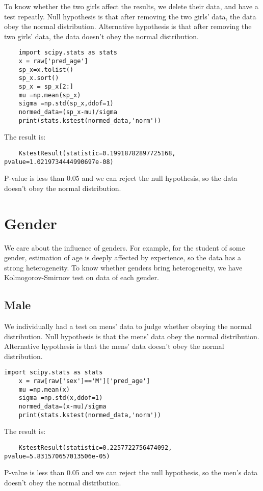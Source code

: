 \documentclass[fancy,11pt,twocol]{elegantbook}
\begin{document}
To know whether the two girls affect the results, we delete their data, and have a test repeatly.
Null hypothesis is that after removing the two girls' data, the data obey the normal distribution.
Alternative hypothesis is that after removing the two girls' data, the data doesn't obey the normal distribution.
\begin{lstlisting}
	import scipy.stats as stats
	x = raw['pred_age']
	sp_x=x.tolist()
	sp_x.sort()
	sp_x = sp_x[2:]
	mu =np.mean(sp_x)
	sigma =np.std(sp_x,ddof=1)
	normed_data=(sp_x-mu)/sigma
	print(stats.kstest(normed_data,'norm'))
\end{lstlisting}
	
The result is:
\begin{lstlisting}
	KstestResult(statistic=0.19918782897725168, pvalue=1.0219734444990697e-08)
\end{lstlisting}
P-value is less than 0.05 and we can reject the null hypothesis, so the data doesn't obey the normal distribution.



\chapter{Gender}
We care about the influence of genders. For example, for the student of some gender, estimation of age is deeply affected by experience, so the data has a strong heterogeneity.
To know whether genders bring heterogeneity, we have Kolmogorov-Smirnov test on data of each gender.
\section{Male}
We individually had a test on mens' data to judge whether obeying the normal distribution.
Null hypothesis is that the mens' data obey the normal distribution.
Alternative hypothesis is that the mens' data doesn't obey the normal distribution.
\begin{lstlisting}
import scipy.stats as stats
	x = raw[raw['sex']=='M']['pred_age']
	mu =np.mean(x)
	sigma =np.std(x,ddof=1)
	normed_data=(x-mu)/sigma
	print(stats.kstest(normed_data,'norm'))
\end{lstlisting}
The result is:
\begin{lstlisting}
	KstestResult(statistic=0.2257722756474092, pvalue=5.831570657013506e-05)
\end{lstlisting}
P-value is less than 0.05 and we can reject the null hypothesis, so the men's data doesn't obey the normal distribution.
\end{document}

